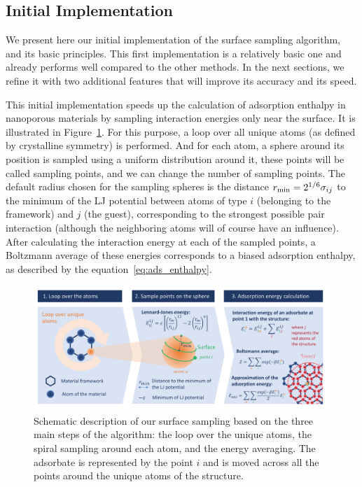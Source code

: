 \documentclass[main]{subfiles}
\begin{document}
\subsection{Initial Implementation}

We present here our initial implementation of the surface sampling algorithm, and its basic principles. This first implementation is a relatively basic one and already performs well compared to the other methods. In the next sections, we refine it with two additional features that will improve its accuracy and its speed.

This initial implementation speeds up the calculation of adsorption enthalpy in nanoporous materials by sampling interaction energies only near the surface. It is illustrated in Figure~\ref{fgr:principle}. For this purpose, a loop over all unique atoms (as defined by crystalline symmetry) is performed. And for each atom, a sphere around its position is sampled using a uniform distribution around it, these points will be called sampling points, and we can change the number of sampling points. The default radius chosen for the sampling spheres is the distance $r_{\text{min}}=2^{1/6}\sigma_{ij}$ to the minimum of the LJ potential between atoms of type $i$ (belonging to the framework) and $j$ (the guest), corresponding to the strongest possible pair interaction (although the neighboring atoms will of course have an influence). After calculating the interaction energy at each of the sampled points, a Boltzmann average of these energies corresponds to a biased adsorption enthalpy, as described by the equation~\ref{eq:ads_enthalpy}.

\begin{figure}[ht]
\centering

  \includegraphics[clip, trim=0.6cm 0.74cm 0.78cm 0.6cm,width=0.95\linewidth]{figures/3-fastsim/Principe_screening.pdf}
  \caption{Schematic description of our surface sampling based on the three main steps of the algorithm: the loop over the unique atoms, the spiral sampling around each atom, and the energy averaging. The adsorbate is represented by the point $i$ and is moved across all the points around the unique atoms of the structure.}\label{fgr:principle}
\end{figure}
\end{document}
